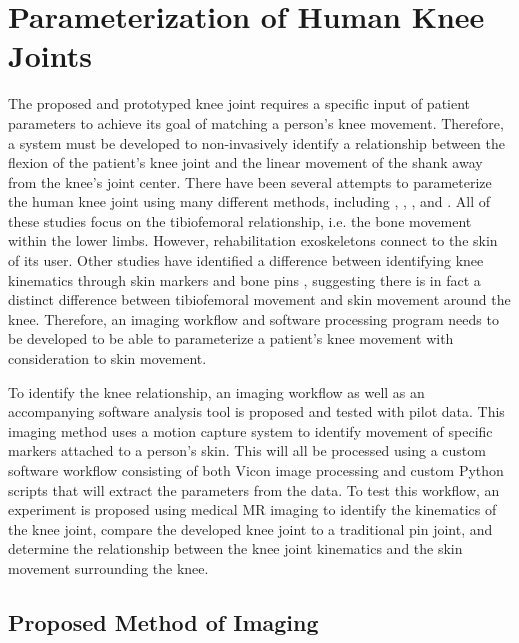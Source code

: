 \chapter{Parameterization of Human Knee Joints}
\label{sec:KneeParams}

The proposed and prototyped knee joint requires a specific input of patient parameters to achieve its goal of matching a person's knee movement. Therefore, a system must be developed to non-invasively identify a relationship between the flexion of the patient's knee joint and the linear movement of the shank away from the knee's joint center. There have been several attempts to parameterize the human knee joint using many different methods, including \cite{3DKinKneeJointOldStabby}, \cite{MRIKneeShape_Unloaded}, \cite{MRIKneeShape_Loaded}, and \cite{ModelAnalysisDeepKneeFlexion}. All of these studies focus on the tibiofemoral relationship, i.e. the bone movement within the lower limbs. However, rehabilitation exoskeletons connect to the skin of its user. Other studies have identified a difference between identifying knee kinematics through skin markers and bone pins \cite{reinschmidt1997effect}, suggesting there is in fact a distinct difference between tibiofemoral movement and skin movement around the knee. Therefore, an imaging workflow and software processing program needs to be developed to be able to parameterize a patient's knee movement with consideration to skin movement.

To identify the knee relationship, an imaging workflow as well as an accompanying software analysis tool is proposed and tested with pilot data. This imaging method uses a motion capture system to identify movement of specific markers attached to a person's skin. This will all be processed using a custom software workflow consisting of both Vicon image processing and custom Python scripts that will extract the parameters from the data. To test this workflow, an experiment is proposed using medical MR imaging to identify the kinematics of the knee joint, compare the developed knee joint to a traditional pin joint, and determine the relationship between the knee joint kinematics and the skin movement surrounding the knee.

\section{Proposed Method of Imaging}
\label{sec:ImaginKneeProcedure}

